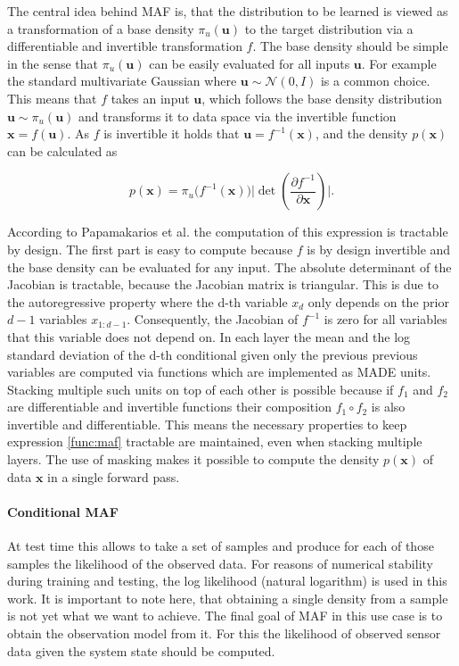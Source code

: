 \documentclass[11pt,titlepage,oneside,openany]{book}
\begin{document}
The central idea behind MAF is, that the distribution to be learned is viewed as a transformation of a base density $\pi_{u} (\pmb{u})$ to the target distribution via a differentiable and invertible transformation $f$. The base density should be simple in the sense that $\pi_{u} (\pmb{u})$ can be easily evaluated for all inputs $\pmb{u}$. For example the standard multivariate Gaussian where $\pmb{u} \sim \mathcal{N}(0, I)$ is a common choice. This means that $f$ takes an input $\pmb{u}$, which follows the base density distribution $\pmb{u} \sim \pi_{u} (\pmb{u})$ and transforms it to data space via the invertible function $\pmb{x}=f(\pmb{u})$. As $f$ is invertible it holds that $\pmb{u} = f^{-1}(\pmb{x})$, and the density $p(\pmb{x})$ can be calculated as

\begin{equation}
	\label{func:maf}
	p(\pmb{x}) = \pi_{u} \bigl(f^{-1}(\pmb{x})\bigr) \biggl\lvert \det \left(\frac{\partial f^{-1}}{\partial \pmb{x}} \right) \biggr\rvert.
\end{equation}

\noindent According to Papamakarios et al. \cite{papamakarios_masked_2017} the computation of this expression is tractable by design. The first part is easy to compute because $f$ is by design invertible and the base density can be evaluated for any input. The absolute determinant of the Jacobian is tractable, because the Jacobian matrix is triangular. This is due to the autoregressive property where the d-th variable $x_d$ only depends on the prior $d-1$ variables $x_{1:d-1}$. Consequently, the Jacobian of $f^{-1}$ is zero for all variables that this variable does not depend on. %
In each layer the mean and the log standard deviation of the d-th conditional given only the previous previous variables are computed via functions which are implemented as MADE units. Stacking multiple such units on top of each other is possible because if $f_1$ and $f_2$ are differentiable and invertible functions their composition $f_1 \circ f_2$ is also invertible and differentiable. This means the necessary properties to keep expression \ref{func:maf} tractable are maintained, even when stacking multiple layers. The use of masking makes it possible to compute the density $p(\pmb{x})$ of data $\pmb{x}$ in a single forward pass.

\paragraph{Conditional MAF}
At test time this allows to take a set of samples and produce for each of those samples the likelihood of the observed data. For reasons of numerical stability during training and testing, the log likelihood (natural logarithm) is used in this work. It is important to note here, that obtaining a single density from a sample is not yet what we want to achieve. The final goal of MAF in this use case is to obtain the observation model from it. For this the likelihood of observed sensor data given the system state should be computed.
\end{document}
